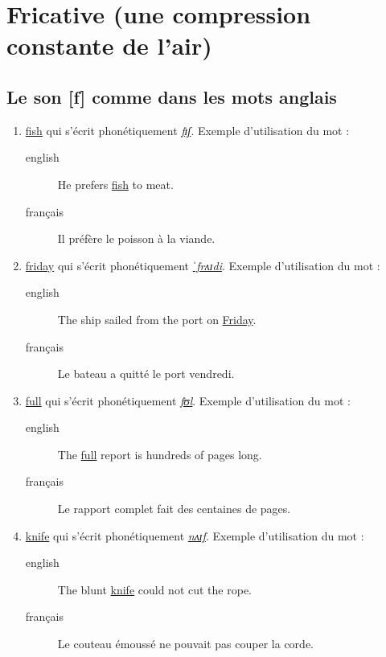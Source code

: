 \documentclass[12pt,a4paper]{book}
\begin{document}
\section{Fricative (une compression constante de l'air)}
\label{sec:org3b742bc}
\subsection{Le son [f] comme dans les mots anglais}
\label{sec:org2a4125a}
\begin{enumerate}
\item \href{http://www.wordreference.com/enfr/fish}{fish} qui s'écrit phonétiquement \href{https://en.oxforddictionaries.com/definition/fish}{\emph{fɪʃ}}. Exemple d'utilisation du mot : 
\begin{description}
\item[{english}] \textenglish{He prefers \href{https://youtu.be/rEm4ynLtGx4}{fish} to meat.}
\item[{français}] Il préfère le poisson à la viande.
\end{description}
\item \href{http://www.wordreference.com/enfr/friday}{friday} qui s'écrit phonétiquement \href{https://en.oxforddictionaries.com/definition/friday}{\emph{ˈfrʌɪdi}}. Exemple d'utilisation du mot :
\begin{description}
\item[{english}] \textenglish{The ship sailed from the port on \href{https://youtu.be/lQ\_pgrjjHLo}{Friday}.}
\item[{français}] Le bateau a quitté le port vendredi.
\end{description}
\item \href{http://www.wordreference.com/enfr/full}{full} qui s'écrit phonétiquement \href{https://en.oxforddictionaries.com/definition/full}{\emph{fʊl}}. Exemple d'utilisation du mot : 
\begin{description}
\item[{english}] \textenglish{The \href{https://youtu.be/LR73DrKX\_bs}{full} report is hundreds of pages long.}
\item[{français}] Le rapport complet fait des centaines de pages.
\end{description}
\item \href{http://www.wordreference.com/enfr/knife}{knife} qui s'écrit phonétiquement \href{https://en.oxforddictionaries.com/definition/knife}{\emph{nʌɪf}}. Exemple d'utilisation du mot : 
\begin{description}
\item[{english}] \textenglish{The blunt \href{https://youtu.be/JUyzH9HpkqE}{knife} could not cut the rope.}
\item[{français}] Le couteau émoussé ne pouvait pas couper la corde.
\end{description}
\end{enumerate}
\end{document}
